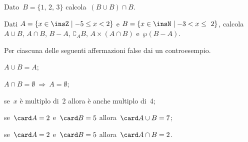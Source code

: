 \begin{esercizio}
\label{ese:5.111}
Dato~$B=\{\text{1, 2, 3}\}$ calcola~$(B\cup B)\cap B$.
\end{esercizio}

\begin{esercizio}
\label{ese:5.112}
Dati $A=\{x\in\insZ\mid -5\le x<2\}$ e $B=\{x\in\insN\mid -3<x\le~2\}$, calcola
$A\cup B$, $A\cap B$, $B-A$, $\complement_{A}B$, $A\times(A\cap B)$ e~$\wp (B-A)$.
\end{esercizio}

\begin{esercizio}
\label{ese:5.113}
Per ciascuna delle seguenti affermazioni false dai un controesempio.

\begin{enumeratea}
\item $A\cup B=A$;
\item $A\cap B=\emptyset\:\Rightarrow\:A=\emptyset $;
\item se~$x$ è multiplo di~2 allora è anche multiplo di~4;
\item se~$\card A =2$ e~$\card B = 5$ allora~$\card A\cup B=7$;
\item se~$\card A =2$ e~$\card B = 5$ allora~$\card A\cap B=2$.
\end{enumeratea}
\end{esercizio}

